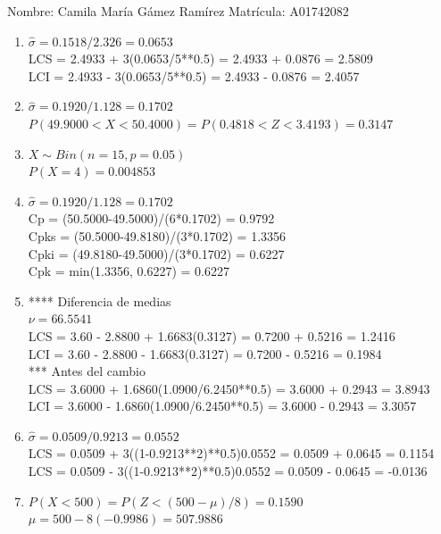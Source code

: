 \documentclass[8pt]{report}
\begin{document}
 \newpage

Nombre: \underline{\hspace*{.2in}}
Camila María Gámez Ramírez
\underline{\hspace*{.2in}} \quad Matr\'icula:\underline{\hspace*{.2in}}
A01742082
\underline{\hspace*{.2in}} \\

\begin{enumerate}
\item $\hat\sigma = 0.1518/2.326 = 0.0653$\\
LCS = 2.4933 + 3(0.0653/5**0.5) = 2.4933 + 0.0876 = 2.5809\\
LCI = 2.4933 - 3(0.0653/5**0.5) = 2.4933 - 0.0876 = 2.4057
\item $\hat\sigma = 0.1920/1.128 = 0.1702$\\
$P(49.9000 < X < 50.4000) = P(0.4818 < Z < 3.4193) = 0.3147$\\
\item $X \sim Bin(n=15, p=0.05)$\\
$P(X = 4) = 0.004853$
\item $\hat\sigma = 0.1920/1.128 = 0.1702$\\
Cp = (50.5000-49.5000)/(6*0.1702) = 0.9792\\
Cpks = (50.5000-49.8180)/(3*0.1702) = 1.3356\\
Cpki = (49.8180-49.5000)/(3*0.1702) = 0.6227\\
Cpk = min(1.3356, 0.6227) = 0.6227
\item **** Diferencia de medias\\
$\nu = 66.5541$\\
LCS = 3.60 - 2.8800 + 1.6683(0.3127) = 0.7200 + 0.5216 = 1.2416\\
LCI = 3.60 - 2.8800 - 1.6683(0.3127) = 0.7200 - 0.5216 = 0.1984\\
*** Antes del cambio\\
LCS = 3.6000 + 1.6860(1.0900/6.2450**0.5) = 3.6000 + 0.2943 = 3.8943\\
LCI = 3.6000 - 1.6860(1.0900/6.2450**0.5) = 3.6000 - 0.2943 = 3.3057\\
\item $\hat\sigma = 0.0509/0.9213 = 0.0552$\\
LCS = 0.0509 + 3((1-0.9213**2)**0.5)0.0552 = 0.0509 + 0.0645 = 0.1154\\
LCS = 0.0509 - 3((1-0.9213**2)**0.5)0.0552 = 0.0509 - 0.0645 = -0.0136
\item $P(X < 500) = P(Z < (500-\mu)/8) = 0.1590$\\
$\mu = 500 - 8(-0.9986) = 507.9886$\\
\end{enumerate}
\end{document}
